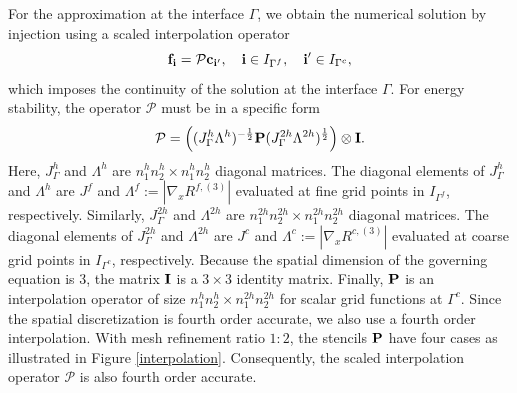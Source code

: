 For the approximation at the interface $\Gamma$, we obtain the numerical solution by injection using a scaled interpolation operator
\begin{equation}\label{continuous_sol}
{\bf f}_{\bf i} = {\mathcal{P}}{\bf c}_{{\bf i}'},\quad {\bf i}\in I_{\Gamma^f},\quad {{\bf i}'}\in I_{\Gamma^c},
\end{equation}
which imposes the continuity of the solution at the interface $\Gamma$. 
For energy stability, the operator ${\mathcal{P}}$ must be in a specific form
\begin{equation}\label{scaleP}
{\mathcal{P}} = \left(({J}^h_\Gamma {\Lambda}^h)^{-\frac{1}{2}}{\bf P}({J}^{2h}_\Gamma {\Lambda}^{2h})^{\frac{1}{2}}\right)\otimes{\bf I}.
\end{equation}
Here, $J_{\Gamma}^h$ and $\Lambda^h$ are $n_1^{h}n_2^{h}\times n_1^{h}n_2^{h}$ diagonal matrices. The diagonal elements of $J_{\Gamma}^h$ and $\Lambda^{h}$ are $J^f$ and $\Lambda^f := |\nabla_x R^{f,(3)}|$ evaluated at fine grid points in $I_{\Gamma^f}$, respectively. Similarly, ${J}_{\Gamma}^{2h}$ and ${{\Lambda}^{2h}}$ are $n_1^{2h}n_2^{2h}\times n_1^{2h}n_2^{2h}$ diagonal matrices. The diagonal elements of $J_{\Gamma}^{2h}$ and $\Lambda^{2h}$ are $J^c$ and $\Lambda^c := |\nabla_x R^{c,(3)}|$ evaluated at coarse grid points in $I_{\Gamma^c}$, respectively. Because the spatial dimension of the governing equation is 3, the matrix ${\bf I}$ is a $3\times 3$ identity matrix. Finally, ${\bf P}$ is an interpolation operator of size $n_1^hn_2^h\times n_1^{2h}n_2^{2h}$ for scalar grid functions at $\Gamma^c$. Since the spatial discretization is fourth order accurate, we also use a fourth order interpolation. With mesh refinement ratio  $1:2$, the stencils ${\bf P}$ have four cases as illustrated in  Figure \ref{interpolation}. Consequently, the scaled interpolation operator $\mathcal{P}$ is also fourth order accurate.

